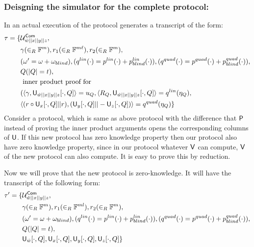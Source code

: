 \subsubsection{\bf Deisgning the simulator for the complete protocol: } In an actual execution of the protocol generates a transcript of the form:
\begin{align*}
\tau = \{ 
& \mathcal{U}^{\mathsf{Com}}_{\hat{w}||x||y||z},\\
& \gamma(\in_R \mathbb{F}^{m}), r_1(\in_R \mathbb{F}^{m\ell}), r_2(\in_R \mathbb{F}^m), \\ 
& (\omega' = \omega+\omega_{blind}), (q^{lin}(\cdot) = p^{lin}(\cdot)+p^{lin}_{blind}(\cdot)), (q^{quad}(\cdot) = p^{quad}(\cdot) + p^{quad}_{blind}(\cdot)),\\
& Q (|Q|=t),\\
& \text{ inner product proof for } \\
& (\langle \gamma,\mathsf{U}_{\hat{w}||x||y||z}[\cdot, Q]\rangle = u_Q, \langle R_Q,\mathsf{U}_{\hat{w}||x||y||z}[\cdot, Q]\rangle=q^{lin}(\eta_Q),\\
& \langle (r\circ \mathsf{U}_x[\cdot,Q]||r),(\mathsf{U}_y[\cdot,Q]||-\mathsf{U}_z[\cdot,Q])\rangle = q^{quad}(\eta_{Q})
\}
\end{align*}
Consider a protocol, which is same as above protocol with the difference that $\mathsf{P}$ instead of proving the inner product arguments opens the corresponding columns of $\mathsf{U}$. If this new protocol has zero knowledge property then our protocol also have zero knowledge property, since in our protocol whatever $\mathsf{V}$ can compute, $\mathsf{V}$ of the new protocol can also compute. It is easy to prove this by reduction.

Now we will prove that the new protocol is zero-knowledge. It will have the transcript of the following form:
\begin{align*}
\tau' = \{
& \mathcal{U}^{\mathsf{Com}}_{\hat{w}||x||y||z},\\
& \gamma(\in_R \mathbb{F}^{m}), r_1(\in_R \mathbb{F}^{ml}), r_2(\in_R \mathbb{F}^m), \\ 
& (\omega' = \omega+\omega_{blind}), (q^{lin}(\cdot) = p^{lin}(\cdot)+p^{lin}_{blind}(\cdot)), (q^{quad}(\cdot) = p^{quad}(\cdot) + p^{quad}_{blind}(\cdot)),\\
& Q (|Q|=t),\\
& \mathsf{U}_{\hat{w}}[\cdot, Q], \mathsf{U}_{x}[\cdot, Q], \mathsf{U}_{y}[\cdot, Q], \mathsf{U}_{z}[\cdot, Q]
\}
\end{align*}

